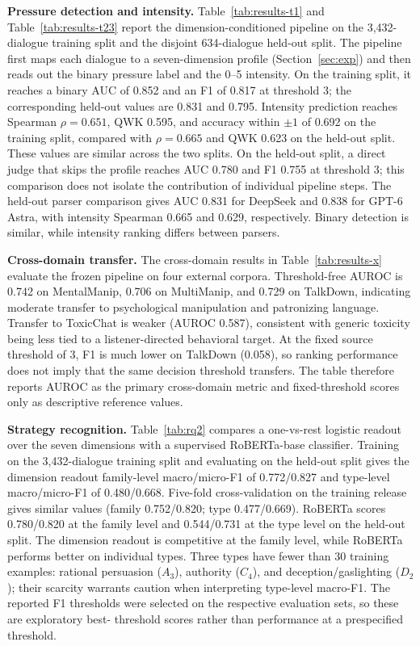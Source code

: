 \documentclass[conference]{IEEEtran}
\begin{document}
\textbf{Pressure detection and intensity.}
Table~\ref{tab:results-t1} and Table~\ref{tab:results-t23} report the
dimension-conditioned pipeline on the 3{,}432-dialogue training split and
the disjoint 634-dialogue held-out split. The pipeline first maps each dialogue
to a seven-dimension profile (Section~\ref{sec:exp}) and then reads out the
binary pressure label and the 0--5 intensity. On the training split, it
reaches a binary AUC of 0.852 and an F1 of 0.817 at threshold 3; the
corresponding held-out values are 0.831 and 0.795. Intensity prediction reaches Spearman
$\rho=0.651$, QWK 0.595, and accuracy within $\pm1$ of 0.692 on the training
split, compared with $\rho=0.665$ and QWK 0.623 on the held-out split.
These values are similar across the two splits. On the held-out split, a direct
judge that skips the profile reaches AUC 0.780 and F1 0.755 at threshold 3; this
comparison does not isolate the contribution of individual pipeline steps.
The held-out parser comparison gives AUC 0.831 for DeepSeek and 0.838 for
GPT-6 Astra, with intensity Spearman 0.665 and 0.629, respectively. Binary
detection is similar, while intensity ranking differs between parsers.

\textbf{Cross-domain transfer.}
The cross-domain results in Table~\ref{tab:results-x} evaluate the frozen
pipeline on four external corpora. Threshold-free AUROC is 0.742 on
MentalManip, 0.706 on MultiManip, and 0.729 on TalkDown, indicating moderate
transfer to psychological manipulation and patronizing language. Transfer to
ToxicChat is weaker (AUROC 0.587), consistent with generic toxicity being
less tied to a listener-directed behavioral target. At the fixed source
threshold of 3, F1 is much lower on TalkDown (0.058), so ranking performance
does not imply that the same decision threshold transfers. The table therefore
reports AUROC as the primary cross-domain metric and fixed-threshold scores
only as descriptive reference values.

\textbf{Strategy recognition.}
Table~\ref{tab:rq2} compares a one-vs-rest logistic readout over the
seven dimensions with a supervised RoBERTa-base classifier. Training on the
3{,}432-dialogue training split and evaluating on the held-out split gives the
dimension readout family-level macro/micro-F1 of 0.772/0.827 and type-level
macro/micro-F1 of 0.480/0.668. Five-fold cross-validation on the training
release gives similar values (family 0.752/0.820; type 0.477/0.669). RoBERTa
scores 0.780/0.820 at the family level and 0.544/0.731 at the type level
on the held-out split. The dimension readout is competitive at the family
level, while RoBERTa performs better on individual types. Three types have
fewer than 30 training examples: rational persuasion ($A_3$), authority
($C_4$), and deception/gaslighting ($D_2$); their scarcity warrants caution
when interpreting type-level macro-F1. The reported F1 thresholds were
selected on the respective evaluation sets, so these are exploratory best-
threshold scores rather than performance at a prespecified threshold.
\end{document}
